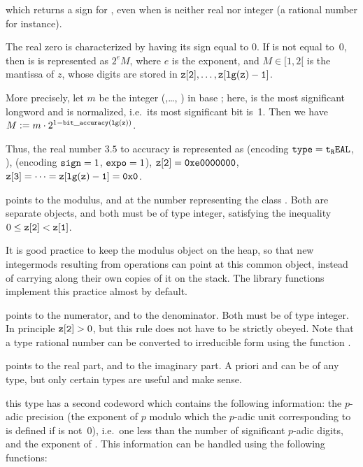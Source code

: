  which returns a sign for , even when
 is neither real nor integer (a rational number for instance).

The real zero is characterized by having its sign equal to 0. If  is
not equal to~0, then is is represented as $2^e M$, where $e$ is the exponent,
and $M\in [1, 2[$ is the mantissa of $z$, whose digits are stored in
${\tt z[2]},\dots, {\tt z[lg(z)-1]}$.

More precisely, let $m$ be the integer (,\dots, )
in base ; here,  is the most significant
longword and is normalized, i.e.~its most significant bit is~1. Then we have
$M := m \cdot 2^{1 - {\tt bit\_accuracy(lg(z))}}$.

Thus, the real number $3.5$ to accuracy  is
represented as  (encoding ${\tt type} = {\tt t_REAL}$, ),
 (encoding ${\tt sign} = 1$, ${\tt expo} = 1$), ${\tt z[2]} =
{\tt 0xe0000000}$, ${\tt z[3]} =\dots = {\tt z[lg(z)-1]} = {\tt 0x0}$.

 points to the modulus, and  at the number representing
the class . Both are separate  objects, and both must be of
type integer, satisfying the inequality $0 \le {\tt z[2]} < {\tt z[1]}$.

It is good practice to keep the modulus object on the heap, so that new
integermods resulting from operations can point at this common object,
instead of carrying along their own copies of it on the stack. The library
functions implement this practice almost by default.

%
 points to the numerator, and  to the denominator. Both
must be of type integer. In principle ${\tt z[2]} > 0$, but this rule does not
have to be strictly obeyed. Note that a type  rational number can be
converted to irreducible form using the function .

%
 points to the real part, and  to the imaginary part. A
priori  and  can be of any type, but only certain types
are useful and make sense.

%
 this type has a second codeword
\kbd{[1]} which contains the following information: the $p$-adic precision
(the exponent of $p$ modulo which the $p$-adic unit corresponding to
 is defined if  is not~0), i.e.~one less than the number of
significant $p$-adic digits, and the exponent of . This information
can be handled using the following functions:

